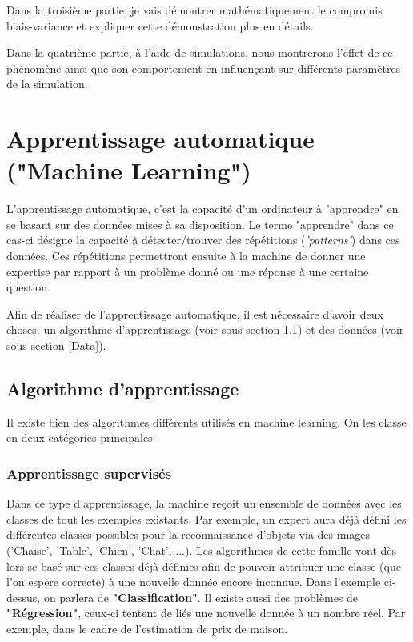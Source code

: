\documentclass[a4paper]{article}
\begin{document}
Dans la troisième partie, je vais démontrer mathématiquement le compromis biais-variance et expliquer cette démonstration plus en détails. \newline

Dans la quatrième partie, à l'aide de simulations, nous montrerons l'effet de ce phénomène ainsi que son comportement en influençant sur différents paramètres de la simulation.\newline

\newpage

\section{Apprentissage automatique ("Machine Learning")}

L'apprentissage automatique, c'est la capacité d'un ordinateur à "apprendre" en se basant sur des données mises à sa disposition. Le terme "apprendre" dans ce cas-ci désigne la capacité à détecter/trouver des répétitions (\textit{'patterns'}) dans ces données. Ces répétitions permettront ensuite à la machine de donner une expertise par rapport à un problème donné ou une réponse à une certaine question. \cite{UnderstandingML}\cite{MLPracticalApproach} \newline 

Afin de réaliser de l'apprentissage automatique, il est nécessaire d'avoir deux choses: un algorithme d'apprentissage (voir sous-section \ref{LearningAlgo}) et des données (voir sous-section \ref{Data}).

\subsection{Algorithme d'apprentissage}
\label{LearningAlgo}
Il existe bien des algorithmes différents utilisés en machine learning. On les classe en deux catégories principales:

\subsubsection{Apprentissage supervisés}
Dans ce type d'apprentissage, la machine reçoit un ensemble de données avec les classes de tout les exemples existants.
Par exemple, un expert aura déjà défini les différentes classes possibles pour la reconnaissance d'objets via des images ('Chaise', 'Table', 'Chien', 'Chat', ...). Les algorithmes de cette famille vont dès lors se basé sur ces classes déjà définies afin de pouvoir attribuer une classe (que l'on espère correcte) à une nouvelle donnée encore inconnue. Dans l'exemple ci-dessus, on parlera de \textbf{"Classification"}. \newline
Il existe aussi des problèmes de \textbf{"Régression"}, ceux-ci tentent de liés une nouvelle donnée à un nombre réel. Par exemple, dans le cadre de l'estimation de prix de maison. \newline
\end{document}
